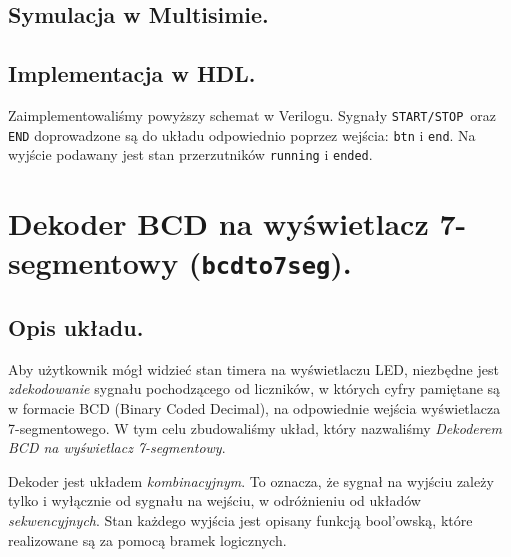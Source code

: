 \documentclass[a4paper,oneside]{report}
\newcommand{\startstop}{\texttt{START/STOP}}
\newcommand{\bcdtoseg}{\texttt{bcd\textunderscore to\textunderscore 7seg}}
\begin{document}
\subsection{Symulacja w Multisimie.}
\subsection{Implementacja w HDL.}
Zaimplementowaliśmy powyższy schemat w Verilogu. Sygnały
\startstop\ oraz \texttt{END} doprowadzone są do układu
odpowiednio poprzez wejścia: \texttt{btn} i
\texttt{end\textunderscore}. Na wyjście podawany jest stan
przerzutników \texttt{running} i \texttt{ended}.


\section{Dekoder BCD na wyświetlacz 7-segmentowy (\bcdtoseg).}
\subsection{Opis układu.}
Aby użytkownik mógł widzieć stan timera na wyświetlaczu LED,
niezbędne jest \emph{zdekodowanie} sygnału pochodzącego od
liczników, w których cyfry pamiętane są w formacie BCD (Binary
Coded Decimal), na odpowiednie wejścia wyświetlacza 7-segmentowego.
W tym celu zbudowaliśmy układ, który nazwaliśmy \emph{Dekoderem
BCD na wyświetlacz 7-segmentowy}.

Dekoder jest układem \emph{kombinacyjnym}. To oznacza, że sygnał na
wyjściu zależy tylko i wyłącznie od sygnału na wejściu, w
odróżnieniu od układów \emph{sekwencyjnych}. Stan każdego wyjścia
jest opisany funkcją bool'owską, które realizowane są za pomocą
bramek logicznych.
\end{document}
